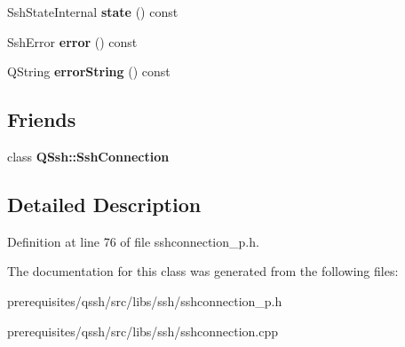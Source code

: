 \begin{DoxyCompactItemize}
\item 
\mbox{\label{class_q_ssh_1_1_internal_1_1_ssh_connection_private_aab3f3291606fcca16e2d36dc5fdbbb6d}} 
Ssh\+State\+Internal {\bfseries state} () const
\item 
\mbox{\label{class_q_ssh_1_1_internal_1_1_ssh_connection_private_ac1fa4b2308442322f189f816979e058b}} 
Ssh\+Error {\bfseries error} () const
\item 
\mbox{\label{class_q_ssh_1_1_internal_1_1_ssh_connection_private_a820ab4f4e3fb2f4637db5ed346569288}} 
Q\+String {\bfseries error\+String} () const
\end{DoxyCompactItemize}
\subsection*{Friends}
\begin{DoxyCompactItemize}
\item 
\mbox{\label{class_q_ssh_1_1_internal_1_1_ssh_connection_private_a9b81fe1f160711a34cda7394fdc61515}} 
class {\bfseries Q\+Ssh\+::\+Ssh\+Connection}
\end{DoxyCompactItemize}


\subsection{Detailed Description}


Definition at line 76 of file sshconnection\+\_\+p.\+h.



The documentation for this class was generated from the following files\+:\begin{DoxyCompactItemize}
\item 
prerequisites/qssh/src/libs/ssh/sshconnection\+\_\+p.\+h\item 
prerequisites/qssh/src/libs/ssh/sshconnection.\+cpp\end{DoxyCompactItemize}
